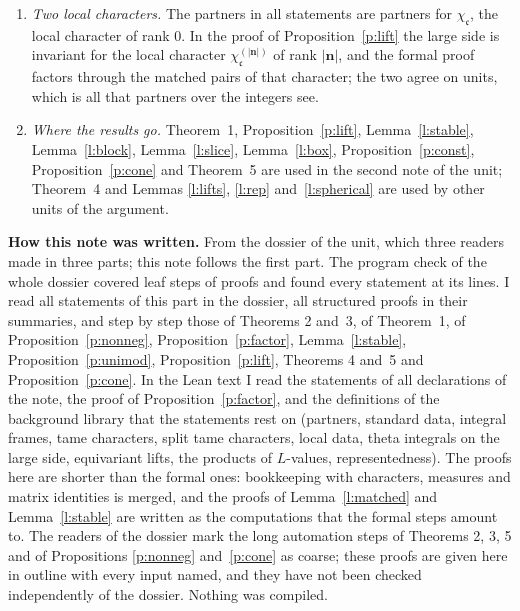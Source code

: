 \documentclass[11pt,a4paper]{article}
\newcommand{\subhead}[1]{\par\addvspace{9pt plus 2pt}\Needspace{4\baselineskip}\noindent\textbf{#1}\enspace\ignorespaces}
\theoremstyle{plainx}
\theoremstyle{uprightx}
\newcommand{\bn}{\mathbf{n}}
\newcommand{\fc}{\mathfrak{c}}
\begin{document}
\begin{enumerate}[label=\textup{\arabic*.},leftmargin=1.6em,itemsep=5pt]
first is used in this note: the diagonalisation of unimodular hermitian matrices over $\hat{\mathfrak{o}}_E$
(Input~2), in the proof of Theorem~2, is proved in the formal text under it.
\item \emph{Two local characters.} The partners in all statements are partners for $\chi_{\fc}$, the local
character of rank $0$. In the proof of Proposition~\ref{p:lift} the large side is invariant for the local
character $\chi^{(|\bn|)}_{\fc}$ of rank $|\bn|$, and the formal proof factors through the matched pairs of that
character; the two agree on units, which is all that partners over the integers see.
\item \emph{Where the results go.} Theorem~1, Proposition~\ref{p:lift}, Lemma~\ref{l:stable}, Lemma~\ref{l:block},
Lemma~\ref{l:slice}, Lemma~\ref{l:box}, Proposition~\ref{p:const}, Proposition~\ref{p:cone} and Theorem~5 are used
in the second note of the unit; Theorem~4 and Lemmas \ref{l:lifts}, \ref{l:rep} and~\ref{l:spherical} are used by
other units of the argument.
\end{enumerate}

\subhead{How this note was written.} From the dossier of the unit, which three readers made in three parts; this
note follows the first part. The program check of the whole dossier covered \UnitSteps{} leaf steps of
\UnitProofs{} proofs and found every statement at its lines. I read all statements of this part in the dossier,
all structured proofs in their summaries, and step by step those of Theorems 2 and~3, of Theorem~1, of
Proposition~\ref{p:nonneg}, Proposition~\ref{p:factor}, Lemma~\ref{l:stable}, Proposition~\ref{p:unimod},
Proposition~\ref{p:lift}, Theorems 4 and~5 and Proposition~\ref{p:cone}. In the Lean text I read the statements of
all declarations of the note, the proof of Proposition~\ref{p:factor}, and the definitions of the background
library that the statements rest on (partners, standard data, integral frames, tame characters, split tame
characters, local data, theta integrals on the large side, equivariant lifts, the products of $L$-values,
representedness). The proofs here are shorter than the formal ones: bookkeeping with characters, measures and
matrix identities is merged, and the proofs of Lemma~\ref{l:matched} and Lemma~\ref{l:stable} are written as the
computations that the formal steps amount to. The readers of the dossier mark the long automation steps of
Theorems 2, 3, 5 and of Propositions \ref{p:nonneg} and~\ref{p:cone} as coarse; these proofs are given here in
outline with every input named, and they have not been checked independently of the dossier. Nothing was compiled.
\end{document}
